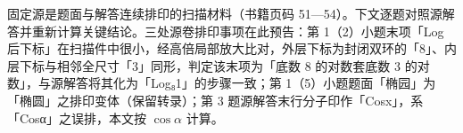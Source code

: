 

\begin{gktip}
固定源是题面与解答连续排印的扫描材料（书籍页码 51—54）。下文逐题对照源解答并重新计算关键结论。三处源卷排印事项在此预告：第 1（2）小题末项「Log 后下标」在扫描件中很小，经高倍局部放大比对，外层下标为封闭双环的「8」、内层下标与相邻全尺寸「3」同形，判定该末项为「底数 8 的对数套底数 3 的对数」，与源解答将其化为「Log₈1」的步骤一致；第 1（5）小题题面「椭园」为「椭圆」之排印变体（保留转录）；第 3 题源解答末行分子印作「Cosx」，系「Cosα」之误排，本文按 $\cos\alpha$ 计算。
\end{gktip}

